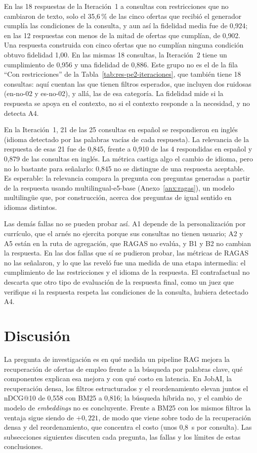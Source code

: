 En las 18 respuestas de la Iteración~1 a consultas con restricciones que no cambiaron de texto, solo el 35,6\,\% de las cinco ofertas que recibió el generador cumplía las condiciones de la consulta, y aun así la fidelidad media fue de 0,924; en las 12 respuestas con menos de la mitad de ofertas que cumplían, de 0,902. Una respuesta construida con cinco ofertas que no cumplían ninguna condición obtuvo fidelidad 1,00. En las mismas 18 consultas, la Iteración~2 tiene un cumplimiento de 0,956 y una fidelidad de 0,886. Este grupo no es el de la fila \enquote{Con restricciones} de la Tabla~\ref{tab:res-pe2-iteraciones}, que también tiene 18 consultas: aquí cuentan las que tienen filtros esperados, que incluyen dos ruidosas (en-no-02 y es-no-02), y allá, las de esa categoría. La fidelidad mide si la respuesta se apoya en el contexto, no si el contexto responde a la necesidad, y no detecta A4.

En la Iteración~1, 21 de las 25 consultas en español se respondieron en inglés (idioma detectado por las palabras vacías de cada respuesta). La relevancia de la respuesta de esas 21 fue de 0,845, frente a 0,910 de las 4 respondidas en español y 0,879 de las consultas en inglés. La métrica castiga algo el cambio de idioma, pero no lo bastante para señalarlo: 0,845 no se distingue de una respuesta aceptable. Es esperable: la relevancia compara la pregunta con preguntas generadas a partir de la respuesta usando multilingual-e5-base (Anexo~\ref{anx:ragas}), un modelo multilingüe que, por construcción, acerca dos preguntas de igual sentido en idiomas distintos.

Las demás fallas no se pueden probar así. A1 depende de la personalización por currículo, que el arnés no ejercita porque sus consultas no tienen usuario; A2 y A5 están en la ruta de agregación, que RAGAS no evalúa, y B1 y B2 no cambian la respuesta. En las dos fallas que sí se pudieron probar, las métricas de RAGAS no las señalaron, y lo que las reveló fue una medida de una etapa intermedia: el cumplimiento de las restricciones y el idioma de la respuesta. El contrafactual no descarta que otro tipo de evaluación de la respuesta final, como un juez que verifique si la respuesta respeta las condiciones de la consulta, hubiera detectado A4.

\section{Discusión}
\label{sec:res-discusion}

La pregunta de investigación es en qué medida un pipeline RAG mejora la recuperación de ofertas de empleo frente a la búsqueda por palabras clave, qué componentes explican esa mejora y con qué costo en latencia. En JobAI, la recuperación densa, los filtros estructurados y el reordenamiento elevan juntos el nDCG@10 de 0,558 con BM25 a 0,816; la búsqueda híbrida no, y el cambio de modelo de \textit{embeddings} no es concluyente. Frente a BM25 con los mismos filtros la ventaja sigue siendo de $+0{,}221$, de modo que viene sobre todo de la recuperación densa y del reordenamiento, que concentra el costo (unos 0,8~s por consulta). Las subsecciones siguientes discuten cada pregunta, las fallas y los límites de estas conclusiones.

